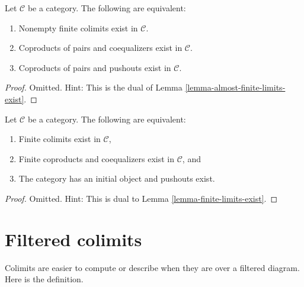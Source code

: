 \begin{lemma}
\label{lemma-almost-finite-colimits-exist}
Let $\mathcal{C}$ be a category.
The following are equivalent:
\begin{enumerate}
\item Nonempty finite colimits exist in $\mathcal{C}$.
\item Coproducts of pairs and coequalizers exist in $\mathcal{C}$.
\item Coproducts of pairs and pushouts exist in $\mathcal{C}$.
\end{enumerate}
\end{lemma}

\begin{proof}
Omitted. Hint: This is the dual of
Lemma \ref{lemma-almost-finite-limits-exist}.
\end{proof}

\begin{lemma}
\label{lemma-colimits-exist}
Let $\mathcal{C}$ be a category.
The following are equivalent:
\begin{enumerate}
\item Finite colimits exist in $\mathcal{C}$,
\item Finite coproducts and coequalizers exist in $\mathcal{C}$, and
\item The category has an initial object and pushouts exist.
\end{enumerate}
\end{lemma}

\begin{proof}
Omitted. Hint: This is dual to Lemma \ref{lemma-finite-limits-exist}.
\end{proof}





\section{Filtered colimits}
\label{section-directed-colimits}

\noindent
Colimits are easier to compute or describe when they
are over a filtered diagram. Here is the definition.

